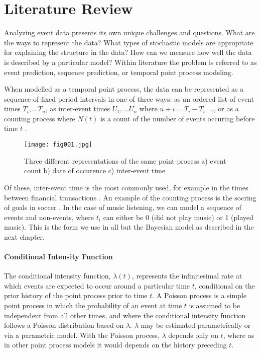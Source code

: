 
\chapter{Literature Review} %


\label{Chapter2} %

Analyzing event data presents its own unique challenges and questions. What are the ways to represent the data?  What types of stochastic 
models  are  appropriate  for  explaining  the  structure  in  the  data? How  can  we  measure  
how  well  the  data  is  described  by  a  particular  model?  Within literature the problem is referred to as event prediction, sequence prediction, or temporal point process modeling.

When modelled as a temporal point process, the data can be represented as a sequence of fixed period intervals in one of three ways: as an ordered list of event times ${T_i,...T_n}$, as inter-event times $U_1,...U_n$ where $u+i = T_i-T_{i-1}$, or as a counting process where  $N(t)$ is a count of the number of events occuring before time $t$ \parencite{Borgan}.

\begin{figure}[h!]
	\texttt{[image: fig001.jpg]}
	\caption{Three different representations of the same point-process a) event count b) date of occurence c) inter-event time}
	\label{fig:fig1}
\end{figure}

Of these, inter-event time is the most commonly used, for example in the times between financial transactions \parencite{EngleRusell}. An example of the counting process is the socring of goals in soccer \parencite{Heuer}. In the case of music listening, we can model a sequence of events and non-events, where $t_i$ can either be 0 (did not play music) or 1 (played music). This is the form we use in all but the Bayesian model as described in the next chapter.

\subsubsection{Conditional Intensity Function}

The conditional intensity function, $\lambda(t)$, represents the infinitesimal rate at which events are expected to occur around a particular time 
$t$, conditional on the prior history of the point 
process prior to time $t$. A Poisson process \parencite{Kingman} is a simple point process in which the probability of an event at time $t$ is assumed to be independent from all other times, and where the conditional intensity function follows a Poisson distribution based on $\lambda$. $\lambda$ may be estimated parametrically \parencite{DuWang} or via a parametric model. With the Poisson process, $\lambda$ depends only on $t$, where as in other point process models it would depends on the history preceding $t$. 
 
